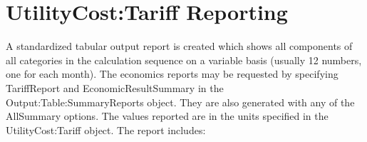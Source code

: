 \section{UtilityCost:Tariff Reporting}\label{utilitycosttariff-reporting}

A standardized tabular output report is created which shows all components of all categories in the calculation sequence on a variable basis (usually 12 numbers, one for each month). The economics reports may be requested by specifying TariffReport and  EconomicResultSummary in the Output:Table:SummaryReports object. They are also generated with any of the AllSummary options. The values reported are in the units specified in the UtilityCost:Tariff object. The report includes: